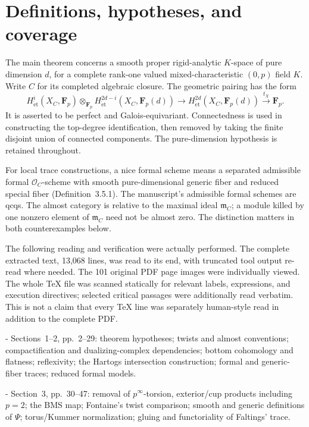 \documentclass[10pt]{article}
\begin{document}
\section*{Definitions, hypotheses, and coverage}
The main theorem concerns a smooth proper rigid-analytic \(K\)-space of pure dimension \(d\), for a complete rank-one valued mixed-characteristic \((0,p)\) field \(K\). Write \(C\) for its completed algebraic closure. The geometric pairing has the form \[H^i_{\mathrm{\acute et}}(X_C,\mathbf F_p)\otimes_{\mathbf F_p}
H^{2d-i}_{\mathrm{\acute et}}(X_C,\mathbf F_p(d))
 \longrightarrow H^{2d}_{\mathrm{\acute et}}(X_C,\mathbf F_p(d))
 \xrightarrow{t_X}\mathbf F_p.\] It is asserted to be perfect and Galois-equivariant. Connectedness is used in constructing the top-degree identification, then removed by taking the finite disjoint union of connected components. The pure-dimension hypothesis is retained throughout.\par
For local trace constructions, a nice formal scheme means a separated admissible formal \(\mathcal O_C\)-scheme with smooth pure-dimensional generic fiber and reduced special fiber (Definition 3.5.1). The manuscript’s admissible formal schemes are qcqs. The almost category is relative to the maximal ideal \(\mathfrak m_C\); a module killed by one nonzero element of \(\mathfrak m_C\) need not be almost zero. The distinction matters in both counterexamples below.\par
The following reading and verification were actually performed. The complete extracted text, 13,068 lines, was read to its end, with truncated tool output re-read where needed. The 101 original PDF page images were individually viewed. The whole TeX file was scanned statically for relevant labels, expressions, and execution directives; selected critical passages were additionally read verbatim. This is not a claim that every TeX line was separately human-style read in addition to the complete PDF.\par
- Sections 1–2, pp. 2–29: theorem hypotheses; twists and almost conventions; compactification and dualizing-complex dependencies; bottom cohomology and flatness; reflexivity; the Hartogs intersection construction; formal and generic-fiber traces; reduced formal models.\par
- Section 3, pp. 30–47: removal of \(p^\infty\)-torsion, exterior/cup products including \(p=2\); the BMS map; Fontaine’s twist comparison; smooth and generic definitions of \(\Psi\); torus/Kummer normalization; gluing and functoriality of Faltings’ trace.\par
\end{document}

